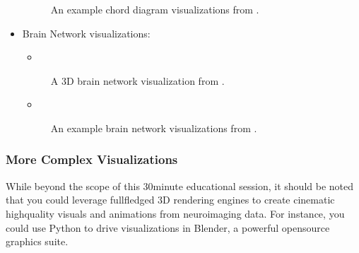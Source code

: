 \documentclass[letterpaper,10pt,english]{jupyterBook}
\begin{document}
\begin{itemize}
\begin{figure}[htbp]
\noindent{}
\caption{An example chord diagram visualizations from .}\label{\detokenize{chapters/03/03b_visualization-tools:mne-chord}}\end{figure}

\item {} 
\sphinxAtStartPar
Brain Network visualizations:
\begin{itemize}
\item {} 
\sphinxAtStartPar
{}

\end{itemize}

\begin{figure}[htbp]
\centering
\capstart

\noindent{}
\caption{A 3D brain network visualization from .}\label{\detokenize{chapters/03/03b_visualization-tools:cerebro-network}}\end{figure}
\begin{itemize}
\item {} 
\sphinxAtStartPar
{}

\end{itemize}

\begin{figure}[htbp]
\centering
\capstart

\noindent{}
\caption{An example brain network visualizations from .}\label{\detokenize{chapters/03/03b_visualization-tools:surfice-network}}\end{figure}

\end{itemize}


\subsubsection{More Complex Visualizations}
\label{\detokenize{chapters/03/03b_visualization-tools:more-complex-visualizations}}
\sphinxAtStartPar
While beyond the scope of this 30\sphinxhyphen{}minute educational session, it should be noted that you could leverage full\sphinxhyphen{}fledged 3D rendering engines to create cinematic high\sphinxhyphen{}quality visuals and animations from neuroimaging data. For instance, you could use Python to drive visualizations in Blender, a powerful open\sphinxhyphen{}source graphics suite.
\end{document}
